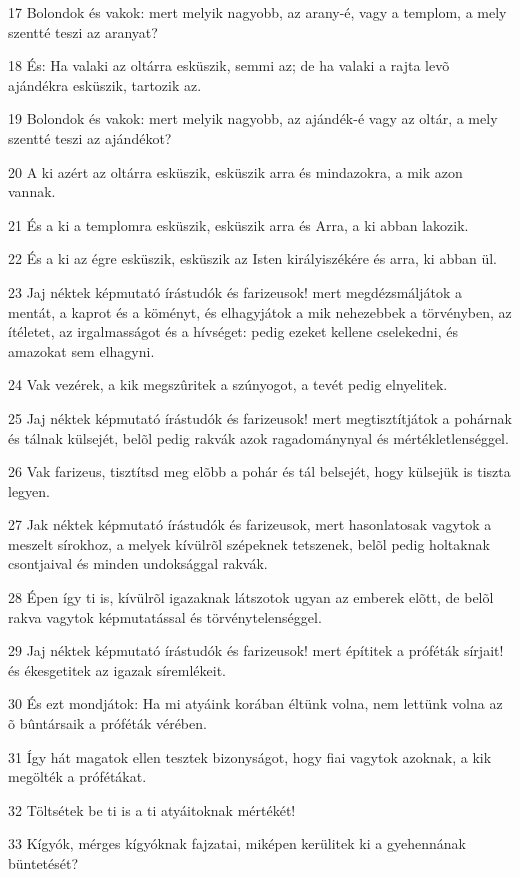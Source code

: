 \par 17 Bolondok és vakok: mert melyik nagyobb, az arany-é, vagy a templom, a mely szentté teszi az aranyat?
\par 18 És: Ha valaki az oltárra esküszik, semmi az; de ha valaki a rajta levõ ajándékra esküszik, tartozik az.
\par 19 Bolondok és vakok: mert melyik nagyobb, az ajándék-é vagy az oltár, a mely szentté teszi az ajándékot?
\par 20 A ki azért az oltárra esküszik, esküszik arra és mindazokra, a mik azon vannak.
\par 21 És a ki a templomra esküszik, esküszik arra és Arra, a ki abban lakozik.
\par 22 És a ki az égre esküszik, esküszik az Isten királyiszékére és arra, ki abban ül.
\par 23 Jaj néktek képmutató írástudók és farizeusok! mert megdézsmáljátok a mentát, a kaprot és a köményt, és elhagyjátok a mik nehezebbek  a törvényben, az ítéletet, az irgalmasságot és a hívséget: pedig ezeket kellene cselekedni, és amazokat sem elhagyni.
\par 24 Vak vezérek, a kik megszûritek a szúnyogot, a tevét pedig elnyelitek.
\par 25 Jaj néktek képmutató írástudók és farizeusok! mert megtisztítjátok a pohárnak és tálnak külsejét, belõl pedig rakvák azok ragadománynyal és mértékletlenséggel.
\par 26 Vak farizeus, tisztítsd meg elõbb a pohár és tál belsejét, hogy külsejük is tiszta legyen.
\par 27 Jak néktek képmutató írástudók és farizeusok, mert hasonlatosak vagytok a meszelt sírokhoz, a melyek kívülrõl szépeknek tetszenek, belõl pedig holtaknak csontjaival és minden undoksággal rakvák.
\par 28 Épen így ti is, kívülrõl igazaknak látszotok ugyan az emberek elõtt, de belõl rakva vagytok képmutatással és törvénytelenséggel.
\par 29 Jaj néktek képmutató írástudók és farizeusok! mert építitek a próféták sírjait! és ékesgetitek az igazak síremlékeit.
\par 30 És ezt mondjátok: Ha mi atyáink korában éltünk volna, nem lettünk volna az õ bûntársaik a próféták vérében.
\par 31 Így hát magatok ellen tesztek bizonyságot, hogy fiai vagytok azoknak, a kik megölték a prófétákat.
\par 32 Töltsétek be ti is a ti atyáitoknak mértékét!
\par 33 Kígyók, mérges kígyóknak fajzatai, miképen kerülitek ki a gyehennának büntetését?
